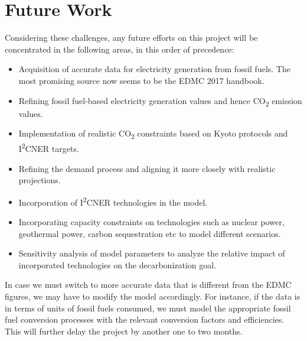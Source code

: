 \documentclass[14pt,a4paper]{article} %
\begin{document}
\section{Future Work} 
Considering these challenges, any future efforts on this project will be concentrated in the following areas, in this order of precedence:

\begin{itemize}

\item Acquisition of accurate data for electricity generation from fossil fuels. The most promising source now seems to be the EDMC 2017 handbook.

\item Refining fossil fuel-based electricity generation values and hence CO\textsubscript{2} emission values.

\item Implementation of realistic CO\textsubscript{2} constraints based on Kyoto protocols and I\textsuperscript{2}CNER targets.

\item Refining the demand process and aligning it more closely with realistic projections.

\item Incorporation of I\textsuperscript{2}CNER technologies in the model.

\item Incorporating capacity constraints on technologies such as nuclear power, geothermal power, carbon sequestration etc to model different scenarios.

\item Sensitivity analysis of model parameters to analyze the relative impact of incorporated technologies on the decarbonization goal.

\end{itemize}

In case we must switch to more accurate data that is different from the EDMC figures, we may have to modify the model accordingly. For instance, if the data is in terms of units of fossil fuels consumed, we must model the appropriate fossil fuel conversion processes with the relevant conversion factors and efficiencies. This will further delay the project by another one to two months.



%


%

\end{document}
